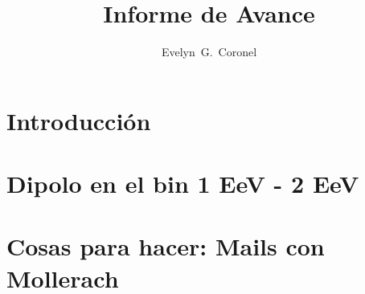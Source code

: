 \documentclass{ibtesis}
\title{Informe de Avance}
\author{Evelyn~G.~Coronel}
\begin{document}
\chapter{Introducción}
\graphicspath{{report_0_Introduccion/}}


% 

% 

% 

% 

% 

\chapter{Dipolo en el bin 1 EeV - 2 EeV}
\graphicspath{{report_6_02_06_2020/}}




\appendix
\chapter{Cosas para hacer:  Mails con Mollerach}



% 



\begin{biblio}
	
\end{biblio}
\end{document}
